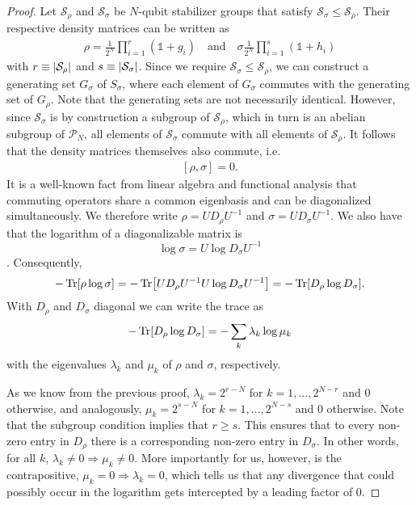 \begin{proof}
   Let $\mathcal{S}_\rho$ and $\mathcal{S}_\sigma$ be $N$-qubit stabilizer
   groups that satisfy $\mathcal{S}_\sigma \leq \mathcal{S}_\rho$. Their
   respective density matrices can be written as
   \begin{align}
     \rho = \frac{1}{2^N} \prod_{i=1}^r (\mathds{1} + g_i) \quad{\text{and}}
       \quad \sigma \frac{1}{2^N} \prod_{i=1}^s (\mathds{1} + h_i)
   \end{align}
   with $r \equiv \abs{\mathcal{S}_\rho}$ and $s \equiv
   \abs{\mathcal{S}_\sigma}$. Since we require $\mathcal{S}_\sigma \leq
   \mathcal{S}_\rho$, we can construct a generating set $G_\sigma$ of
   $S_\sigma$, where each element of $G_\sigma$ commutes with the generating
   set of $G_\rho$. Note that the generating sets are not necessarily
   identical. However, since $\mathcal{S}_\sigma$ is by construction a subgroup
   of $\mathcal{S}_\rho$, which in turn is an abelian subgroup of
   $\mathcal{P}_N$, all elements of $\mathcal{S}_\sigma$ commute with all elements of
   $\mathcal{S}_\rho$. It follows that the density matrices themselves also
   commute, i.e.
   \begin{align}
      \left[\rho, \sigma\right] = 0
   .\end{align}
   It is a well-known fact from linear algebra and functional analysis that
   commuting operators share a common eigenbasis and can be diagonalized
   simultaneously. We therefore write $\rho = UD_\rho U^{-1}$ and $\sigma =
   UD_\sigma U^{-1}$. We also have that the logarithm of a diagonalizable
   matrix is \cite{hallElementaryIntroductionGroups2000}
   $$\log \sigma = U \log D_\sigma U^{-1}$$. Consequently,
   \begin{align}
      -\Tr[\rho \log\sigma] = -\Tr[U D_\rho U^{-1} U \log D_\sigma U^{-1}] =
      -\Tr[D_\rho \log D_\sigma] 
   .\end{align}
   With $D_\rho$ and $D_\sigma$ diagonal we can write the trace as
   \begin{align}\label{eq:the-sum}
      -\Tr[D_\rho \log D_\sigma] = -\sum_k \lambda_k \log \mu_k
   \end{align}
   with the eigenvalues $\lambda_k$ and $\mu_k$ of $\rho$ and $\sigma$,
   respectively.

   As we know from the previous proof, $\lambda_k = 2^{r-N}$ for
   $k=1,\ldots,2^{N-r}$ and $0$ otherwise, and analogously, $\mu_k = 2^{s-N}$
   for $k=1,\ldots,2^{N-s}$ and $0$ otherwise. Note that the subgroup condition
   implies that $r\geq s$. This ensures that to every non-zero entry in
   $D_\rho$ there is a corresponding non-zero entry in $D_\sigma$. In other
   words, for all $k$, $\lambda_k \neq 0 \Rightarrow \mu_k \neq 0$. More
   importantly for us, however, is the contrapositive, $\mu_k = 0 \Rightarrow
   \lambda_k = 0$, which tells us that any divergence that could possibly occur
   in the logarithm gets intercepted by a leading factor of $0$.


\end{proof}
